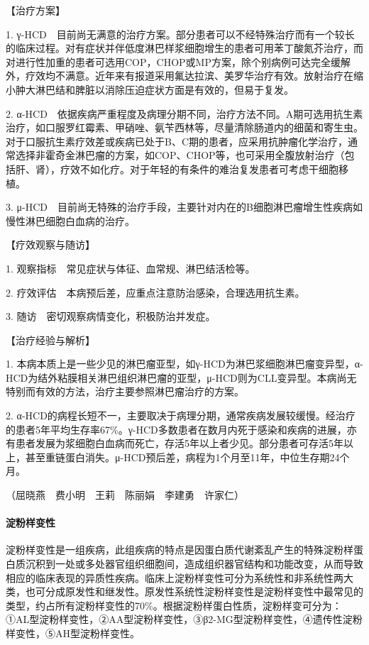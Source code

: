 【治疗方案】

1.
γ-HCD　目前尚无满意的治疗方案。部分患者可以不经特殊治疗而有一个较长的临床过程。对有症状并伴低度淋巴样浆细胞增生的患者可用苯丁酸氮芥治疗，而对进行性加重的患者可选用COP，CHOP或MP方案，除个别病例可达完全缓解外，疗效均不满意。近年来有报道采用氟达拉滨、美罗华治疗有效。放射治疗在缩小肿大淋巴结和脾脏以消除压迫症状方面是有效的，但易于复发。

2.
α-HCD　依据疾病严重程度及病理分期不同，治疗方法不同。A期可选用抗生素治疗，如口服罗红霉素、甲硝唑、氨苄西林等，尽量清除肠道内的细菌和寄生虫。对于口服抗生素疗效差或疾病已处于B、C期的患者，应采用抗肿瘤化学治疗，通常选择非霍奇金淋巴瘤的方案，如COP、CHOP等，也可采用全腹放射治疗（包括肝、肾），疗效不如化疗。对于年轻的有条件的难治复发患者可考虑干细胞移植。

3.
μ-HCD　目前尚无特殊的治疗手段，主要针对内在的B细胞淋巴瘤增生性疾病如慢性淋巴细胞白血病的治疗。

【疗效观察与随访】

1. 观察指标　常见症状与体征、血常规、淋巴结活检等。

2. 疗效评估　本病预后差，应重点注意防治感染，合理选用抗生素。

3. 随访　密切观察病情变化，积极防治并发症。

【治疗经验与解析】

1.
本病本质上是一些少见的淋巴瘤亚型，如γ-HCD为淋巴浆细胞淋巴瘤变异型，α-HCD为结外粘膜相关淋巴组织淋巴瘤的亚型，μ-HCD则为CLL变异型。本病尚无特别而有效的方法，治疗主要参照淋巴瘤治疗的方案。

2.
α-HCD的病程长短不一，主要取决于病理分期，通常疾病发展较缓慢。经治疗的患者5年平均生存率67\%。γ-HCD多数患者在数月内死于感染和疾病的进展，亦有患者发展为浆细胞白血病而死亡，存活5年以上者少见。部分患者可存活5年以上，甚至重链蛋白消失。μ-HCD预后差，病程为1个月至11年，中位生存期24个月。

（屈晓燕　费小明　王莉　陈丽娟　李建勇　许家仁）

\paragraph{淀粉样变性}

淀粉样变性是一组疾病，此组疾病的特点是因蛋白质代谢紊乱产生的特殊淀粉样蛋白质沉积到一处或多处器官组织细胞间，造成组织器官结构和功能改变，从而导致相应的临床表现的异质性疾病。临床上淀粉样变性可分为系统性和非系统性两大类，也可分成原发性和继发性。原发性系统性淀粉样变性是淀粉样变性中最常见的类型，约占所有淀粉样变性的70\%。根据淀粉样蛋白性质，淀粉样变可分为：①AL型淀粉样变性，②AA型淀粉样变性，③β2-MG型淀粉样变性，④遗传性淀粉样变性，⑤AH型淀粉样变性。

